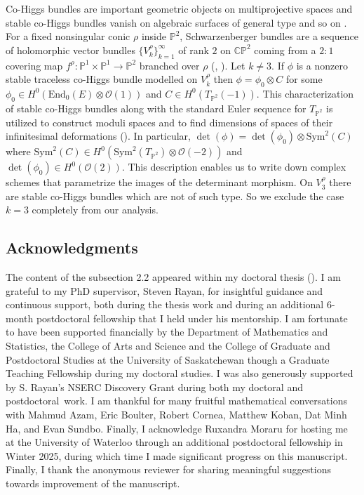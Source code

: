 \documentclass[12pt]{amsart}
\theoremstyle{definition}
\theoremstyle{remark}
\numberwithin{equation}{section}
\begin{document}
Co-Higgs bundles are important geometric objects on multiprojective spaces and stable co-Higgs bundles vanish on algebraic surfaces of general type and so on \cite{Ste3}. For a fixed nonsingular conic $\rho$ inside $\mathbb{P}^2$, Schwarzenberger bundles are a sequence of holomorphic vector bundles $\{V_k^\rho\}_{k=1}^{\infty}$ of rank $2$ on $\mathbb{CP}^2$ coming from a $2:1$ covering map $f^\rho: \mathbb{P}^1\times\mathbb{P}^1\to\mathbb{P}^2$ branched over $\rho$ (\cite{sch}, \cite{Fried}). Let $k\neq 3$. If $\phi$ is a nonzero stable traceless co-Higgs bundle modelled on $V_k^\rho$ then $\phi = \phi_0\otimes C$ for some  
$\phi_0\in H^0(\mbox{End}_0(E)\otimes\mathcal{O}(1))$ and $C\in H^0(T_{\mathbb{P}^2}(-1))$. This characterization of stable co-Higgs bundles along with the standard Euler sequence for $T_{\mathbb{P}^2}$ is utilized to construct moduli spaces and to find dimensions of spaces of their infinitesimal deformations (\cite{Ste3}). In particular, $\det(\phi) = \det(\phi_0)\otimes\mbox{Sym}^2(C)$ where $\mbox{Sym}^2(C)\in H^0(\mbox{Sym}^2(T_{\mathbb{P}^2})\otimes\mathcal{O}(-2))$ and $\det(\phi_0)\in H^0(\mathcal{O}(2))$. This description enables us to write down complex schemes that parametrize the images of the determinant morphism. On $V_3^\rho$ there are stable co-Higgs bundles which are not of such type. So we exclude the case $k=3$ completely from our analysis.

\subsection{Acknowledgments}
The content of the subsection 2.2 appeared within my doctoral thesis (\cite{Banerjee}). I am grateful to my PhD supervisor, Steven Rayan, for insightful guidance and continuous support, both during the thesis work and during an additional $6$-month postdoctoral fellowship that I held under his mentorship. I am fortunate to have been supported financially by the Department of Mathematics and Statistics, the College of Arts and Science and the College of Graduate and Postdoctoral Studies at the University of Saskatchewan though a Graduate Teaching Fellowship during my doctoral studies. I was also generously supported by S. Rayan's NSERC Discovery Grant during both my doctoral and postdoctoral work. I am thankful for many fruitful mathematical conversations with Mahmud Azam, Eric Boulter, Robert Cornea, Matthew Koban, Dat Minh Ha, and Evan Sundbo. Finally, I acknowledge Ruxandra Moraru for hosting me at the University of Waterloo through an additional postdoctoral fellowship in Winter 2025, during which time I made significant progress on this manuscript. Finally, I thank the anonymous reviewer for sharing meaningful suggestions towards improvement of the manuscript. 
\end{document}
